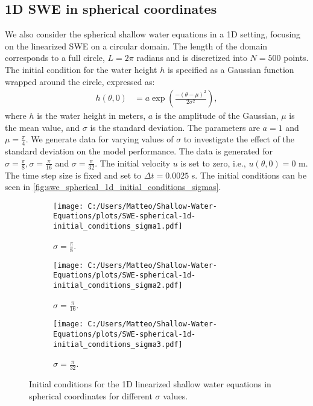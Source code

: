 \subsection*{1D SWE in spherical coordinates}
We also consider the spherical shallow water equations in a 1D setting, focusing on the linearized SWE on a circular domain.
The length of the domain corresponds to a full circle, $L = 2 \pi$ radians and is discretized into $N = 500$ points.
The initial condition for the water height $h$ is specified as a Gaussian function wrapped around the circle, expressed as:
\begin{align}\label{eq:1D_swe_spherical_ic}
    h(\theta, 0) &= a \exp \left( \frac{-{(\theta-\mu)}^2}{2 \sigma^2} \right),
\end{align}
where $h$ is the water height in meters, $a$ is the amplitude of the Gaussian, $\mu$ is the mean value, and $\sigma$ is the standard deviation.
The parameters are $a = 1$  and $\mu = \frac{\pi}{4}$.
We generate data for varying values of $\sigma$ to investigate the effect of the standard deviation on the model performance.
The data is generated for $\sigma = \frac{\pi}{8}, \sigma = \frac{\pi}{16}$ and $\sigma = \frac{\pi}{32}$.
The initial velocity $u$ is set to zero, i.e., $u(\theta,0) = 0$ m.
The time step size is fixed and set to $\Delta t = 0.0025$ s.
The initial conditions can be seen in \autoref{fig:swe_spherical_1d_initial_conditions_sigmas}.
\begin{figure}[H]
    \centering
    \begin{subfigure}[b]{0.3\textwidth}
        \centering
        \texttt{[image: C:/Users/Matteo/Shallow-Water-Equations/plots/SWE-spherical-1d-initial\_conditions\_sigma1.pdf]}
        \caption{$\sigma = \frac{\pi}{8}$.}\label{fig:swe_spherical_1d_sigma1}
    \end{subfigure}
    \hfill
    \begin{subfigure}[b]{0.3\textwidth}
        \centering
        \texttt{[image: C:/Users/Matteo/Shallow-Water-Equations/plots/SWE-spherical-1d-initial\_conditions\_sigma2.pdf]}
        \caption{$\sigma = \frac{\pi}{16}$.}\label{fig:swe_spherical_1d_sigma2}
    \end{subfigure}
    \hfill
    \begin{subfigure}[b]{0.3\textwidth}
        \centering
        \texttt{[image: C:/Users/Matteo/Shallow-Water-Equations/plots/SWE-spherical-1d-initial\_conditions\_sigma3.pdf]}
        \caption{$\sigma = \frac{\pi}{32}$.}\label{fig:swe_spherical_1d_sigma3}
    \end{subfigure}
    \caption{Initial conditions for the 1D linearized shallow water equations in spherical coordinates for different \(\sigma\) values.}\label{fig:swe_spherical_1d_initial_conditions_sigmas}
\end{figure}
